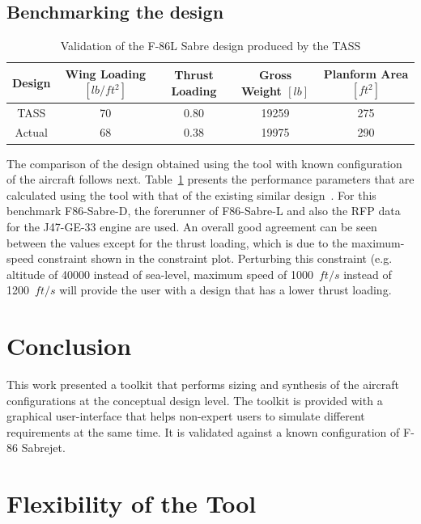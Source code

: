 \documentclass[pdftex,11pt,letter]{article}
\begin{document}
\subsection{Benchmarking the design}
\begin{table}[h!]
\caption{Validation of the F-86L Sabre design produced by the TASS}
\centering 
\begin{tabular}{c| c c c c}
\hline\hline
Design & Wing Loading $[lb/ft^2]$ & Thrust Loading & Gross Weight $[lb]$ & Planform Area $[ft^2]$ \\
\hline\hline
TASS             & 70 &  0.80 & 19259 & 275 \\
Actual           & 68 &  0.38 & 19975 & 290 \\
\hline\hline
\end{tabular}
\label{tab:validation}
\end{table}
The comparison of the design obtained using the tool with known configuration of the aircraft follows next. Table~\ref{tab:validation} presents the performance parameters that are calculated using the tool with that of the existing similar design~\cite{valid1,valid2}. For this benchmark F86-Sabre-D, the forerunner of F86-Sabre-L and also the  RFP data for the J47-GE-33 engine are used. An overall good agreement can be seen between the values except for the thrust loading, which is due to the maximum-speed constraint shown in the constraint plot. Perturbing this constraint (e.g. altitude of 40000 instead of sea-level, maximum speed of 1000~$ft/s$ instead of 1200~$ft/s$ will provide the user with a design that has a lower thrust loading.

\section{Conclusion}\label{conclusion}

This work presented a toolkit that performs sizing and synthesis of the aircraft configurations at the conceptual design level. The toolkit is provided with a graphical user-interface that helps non-expert users to simulate different requirements at the same time. It is validated against a known configuration of F-86 Sabrejet.


	

\appendix

\section{Flexibility of the Tool}
\label{appendix:flexibility}
\end{document}
